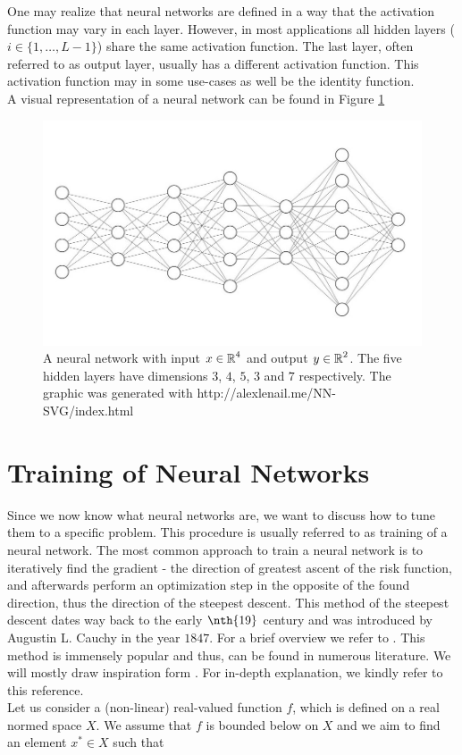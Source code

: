One may realize that neural networks are defined in a way that the activation function may vary in each layer. However, in most applications all hidden layers ($i \in \{1, \ldots, L-1\}$) share the same activation function. The last layer, often referred to as output layer, usually has a different activation function. This activation function may in some use-cases as well be the identity function.\\
A visual representation of a neural network can be found in Figure \ref{img_nn}


\begin{figure}[H]
\begin{center}
   \begin{minipage}[b]{0.9\linewidth}
      \includegraphics[width=\linewidth]{neural_net}
      \caption{A neural network with input $x\in \operatorname{\mathbb{R}}^4$ and output $y\in\operatorname{\mathbb{R}}^2$. The five hidden layers have dimensions $3$, $4$, $5$, $3$ and $7$ respectively. The graphic was generated with http://alexlenail.me/NN-SVG/index.html}\label{img_nn}
	\end{minipage}
\end{center}
\end{figure}


\section{Training of Neural Networks}\label{sec:training_of_nn}
Since we now know what neural networks are, we want to discuss how to tune them to a specific problem. This procedure is usually referred to as training of a neural network. The most common approach to train a neural network is to iteratively find the gradient - the direction of greatest ascent of the risk function, and afterwards perform an optimization step in the opposite of the found direction, thus the direction of the steepest descent. This method of the steepest descent dates way back to the early $\nth{19}$ century and was introduced by Augustin L. Cauchy in the year $1847$. For a brief overview we refer to \cite{lemarechal2012cauchy}. This method is immensely popular and thus, can be found in numerous literature. We will mostly draw inspiration form \cite[Chapter~XV]{kantorovich2016functional}. For in-depth explanation, we kindly refer to this reference.\\
Let us consider a (non-linear) real-valued function $f$, which is defined on a real normed space $X$. We assume that $f$ is bounded below on $X$ and we aim to find an element $x^{\ast}\in X$ such that

